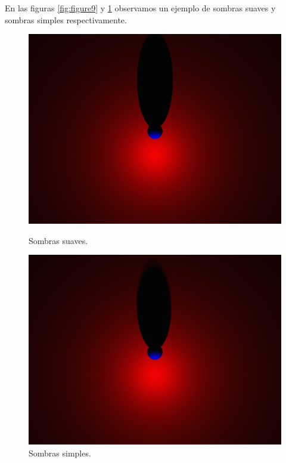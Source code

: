 \documentclass[a4paper,10pt]{article}
\begin{document}
En las figuras \ref{fig:figure9} y \ref{fig:figure10} observamos un ejemplo
de sombras suaves y sombras simples respectivamente.

\begin{figure}[ht]
\begin{minipage}[b]{0.5\linewidth}
\centering
\includegraphics[scale=0.17]{scene21.png}
\caption{Sombras suaves.}
\label{fig:figure9}
\end{minipage}
\hspace{0.5cm}
\begin{minipage}[b]{0.5\linewidth}
\centering
\includegraphics[scale=0.17]{scene21soft.png}
\caption{Sombras simples.}
\label{fig:figure10}
\end{minipage}
\end{figure}
\end{document}
